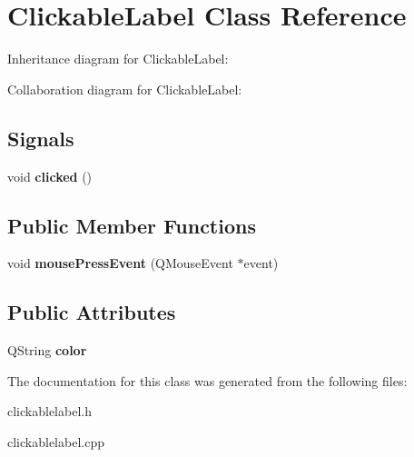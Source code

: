 \hypertarget{classClickableLabel}{}\section{Clickable\+Label Class Reference}
\label{classClickableLabel}


Inheritance diagram for Clickable\+Label\+:


Collaboration diagram for Clickable\+Label\+:
\subsection*{Signals}
\begin{DoxyCompactItemize}
\item 
\mbox{\label{classClickableLabel_aba68cb811a595c6d90f5c994f2b31f4b}} 
void {\bfseries clicked} ()
\end{DoxyCompactItemize}
\subsection*{Public Member Functions}
\begin{DoxyCompactItemize}
\item 
\mbox{\label{classClickableLabel_a602a8b3a3fa31497f31e549d46576524}} 
void {\bfseries mouse\+Press\+Event} (Q\+Mouse\+Event $\ast$event)
\end{DoxyCompactItemize}
\subsection*{Public Attributes}
\begin{DoxyCompactItemize}
\item 
\mbox{\label{classClickableLabel_a07430e9649fe89081752f343b8172889}} 
Q\+String {\bfseries color}
\end{DoxyCompactItemize}


The documentation for this class was generated from the following files\+:\begin{DoxyCompactItemize}
\item 
clickablelabel.\+h\item 
clickablelabel.\+cpp\end{DoxyCompactItemize}
